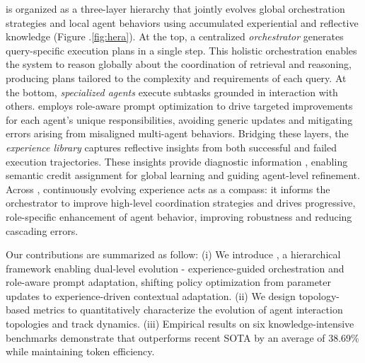 \hero is organized as a three-layer hierarchy that jointly evolves global orchestration strategies and local agent behaviors using accumulated experiential and reflective knowledge (Figure .\ref{fig:hera}). At the top, a centralized \textit{orchestrator} generates query-specific execution plans in a single step. This holistic orchestration \citep{ke2026mas} enables the system to reason globally about the coordination of retrieval and reasoning, producing plans tailored to the complexity and requirements of each query. At the bottom, \textit{specialized agents} execute subtasks grounded in interaction with others. \hero employs role-aware prompt optimization to drive targeted improvements for each agent’s unique responsibilities, avoiding generic updates and mitigating errors arising from misaligned multi-agent behaviors. Bridging these layers, the \textit{experience library} captures reflective insights from both successful and failed execution trajectories. These insights provide diagnostic information \citep{agrawal2025gepa}, enabling semantic credit assignment for global learning and guiding agent-level refinement. Across \hero, continuously evolving experience acts as a compass: it informs the orchestrator to improve high-level coordination strategies and drives progressive, role-specific enhancement of agent behavior, improving robustness and reducing cascading errors.


Our contributions are summarized as follow: (i) We introduce \hero, a hierarchical framework enabling dual-level evolution - experience-guided orchestration and role-aware prompt adaptation, shifting policy optimization from parameter updates to experience-driven contextual adaptation. (ii) We design topology-based metrics to quantitatively characterize the evolution of agent interaction topologies and track dynamics. (iii) Empirical results on six knowledge-intensive benchmarks demonstrate that \hero outperforms recent SOTA by an average of 38.69\% while maintaining token efficiency. 
